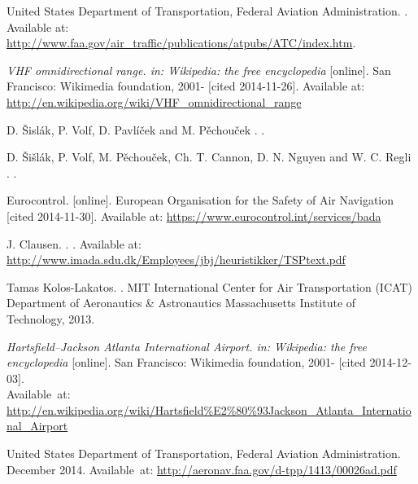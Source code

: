\begin{thebibliography}{1}
United States Department of Transportation, Federal Aviation Administration.
.
\newblock Available at: \url{http://www.faa.gov/air_traffic/publications/atpubs/ATC/index.htm}.

{\em VHF omnidirectional range. in: Wikipedia: the free encyclopedia} [online].
\newblock San Francisco: Wikimedia foundation, 2001- [cited 2014-11-26].
\newblock Available at: \url{http://en.wikipedia.org/wiki/VHF_omnidirectional_range}

D. Šislák, P. Volf, D. Pavlíček and M. Pěchouček
.
.

D. Šišlák, P. Volf, M. Pěchouček, Ch. T. Cannon, D. N. Nguyen and W. C. Regli
.
.

Eurocontrol.
 [online].
\newblock European Organisation for the Safety of Air Navigation [cited 2014-11-30].
\newblock Available at: \url{https://www.eurocontrol.int/services/bada}

J. Clausen.
.
.
\newblock Available at: \url{http://www.imada.sdu.dk/Employees/jbj/heuristikker/TSPtext.pdf}

Tamas Kolos-Lakatos.
.
\newblock MIT International Center for Air Transportation (ICAT) Department of Aeronautics \& Astronautics Massachusetts Institute of Technology, 2013.

{\em Hartsfield–Jackson Atlanta International Airport. in: Wikipedia: the free encyclopedia} [online].
\newblock San Francisco: Wikimedia foundation, 2001- [cited 2014-12-03]. \\
\newblock Available~at: \url{http://en.wikipedia.org/wiki/Hartsfield\%E2\%80\%93Jackson_Atlanta_International_Airport}

United States Department of Transportation, Federal Aviation Administration.
 December 2014.
\newblock Available~at: \url{http://aeronav.faa.gov/d-tpp/1413/00026ad.pdf}


\end{thebibliography}
